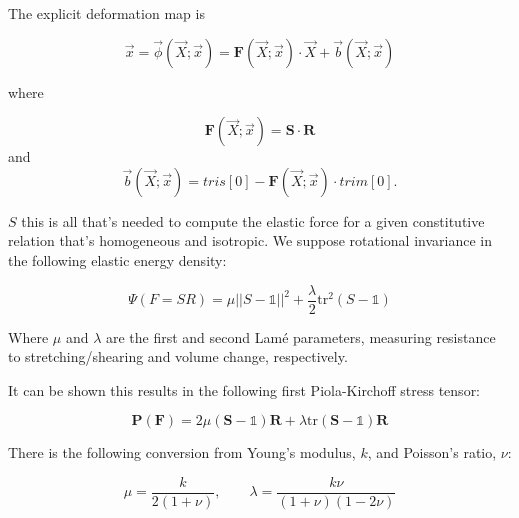 The explicit deformation map is

$$\vec{x}= \vec{\phi}(\vec{X}; \vec{x})= \mathbf{F}(\vec{X}; \vec{x})\cdot \vec{X} + \vec{b}(\vec{X}; \vec{x})$$

where

$$\mathbf{F}(\vec{X}; \vec{x}) = \mathbf{S}\cdot\mathbf{R}$$ 
and 
$$\vec{b}(\vec{X}; \vec{x}) = tris[0] - \mathbf{F}(\vec{X}; \vec{x}) \cdot trim[0].$$

$S$ this is all that's needed to compute the elastic force for a given constitutive relation that's homogeneous and isotropic.  We suppose rotational invariance in the following elastic energy density:

$$
\Psi(F=SR) = \mu||S-\mathbb{1}||^2 + \frac{\lambda}{2}\text{tr}^2(S-\mathbb{1})
$$

Where $\mu$ and $\lambda$ are the first and second Lamé parameters, measuring resistance to stretching/shearing and volume change, respectively.

It can be shown this results in the following first Piola-Kirchoff stress tensor:

$$
\mathbf{P}(\mathbf{F})= 2\mu(\mathbf{S}-\mathbb{1})\mathbf{R} + \lambda \text{tr}(\mathbf{S}-\mathbb{1})\mathbf{R}
$$

There is the following conversion from Young's modulus, $k$, and Poisson's ratio, $\nu$:

$$
\mu = \frac{k}{2(1+\nu)},\qquad \lambda=\frac{k\nu}{(1+\nu)(1-2\nu)}
$$
